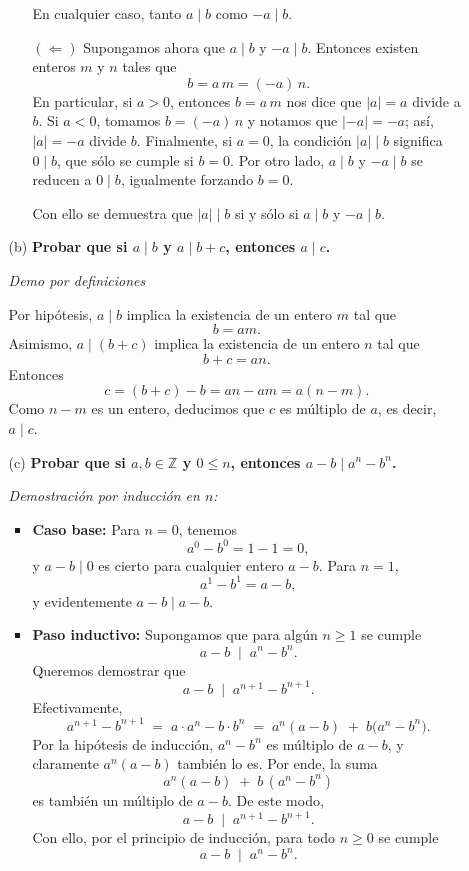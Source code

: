 \documentclass[12pt]{article}
\begin{document}
\begin{enumerate}
\begin{enumerate}
\begin{itemize}
    En cualquier caso, tanto $a \mid b$ como $-a \mid b$.
    
    \item[$(\Leftarrow)$] Supongamos ahora que $a \mid b$ y $-a \mid b$. Entonces existen enteros $m$ y $n$ tales que
    \[
    b = a\,m = (-a)\,n.
    \]
    En particular, si $a > 0$, entonces $b = a\,m$ nos dice que $|a| = a$ divide a $b$.  
    Si $a < 0$, tomamos $b = (-a)\,n$ y notamos que $|-a| = -a$; as\'i, $|a| = -a$ divide $b$.  
    Finalmente, si $a=0$, la condici\'on $|a|\mid b$ significa $0 \mid b$, que s\'olo se cumple si $b=0$. Por otro lado, $a\mid b$ y $-a\mid b$ se reducen a $0\mid b$, igualmente forzando $b=0$.  
    
    Con ello se demuestra que $|a|\mid b$ si y s\'olo si $a \mid b$ y $-a \mid b$.
    \end{itemize}
    
    \item[(b)] \textbf{Probar que si $a \mid b$ y $a \mid b + c$, entonces $a \mid c$.}
    
    \noindent
    \textit{Demo por definiciones}
    
    Por hip\'otesis, $a \mid b$ implica la existencia de un entero $m$ tal que 
    \[
    b = am.
    \]
    Asimismo, $a \mid (b + c)$ implica la existencia de un entero $n$ tal que
    \[
    b + c = a n.
    \]
    Entonces
    \[
    c = (b + c) - b = a n - a m = a(n - m).
    \]
    Como $n - m$ es un entero, deducimos que $c$ es m\'ultiplo de $a$, es decir, $a \mid c$.
    
    \item[(c)] \textbf{Probar que si $a,b \in \mathbb{Z}$ y $0 \leq n$, entonces $a - b \mid a^n - b^n$.}
    
    \noindent
    \textit{Demostraci\'on por inducci\'on en $n$:}
    
    \begin{itemize}
    \item \textbf{Caso base:}  
    Para $n=0$, tenemos 
    \[
    a^0 - b^0 = 1 - 1 = 0,
    \]
    y $a-b \mid 0$ es cierto para cualquier entero $a-b$. Para $n=1$, 
    \[
    a^1 - b^1 = a - b,
    \]
    y evidentemente $a-b \mid a-b$.
    
    \item \textbf{Paso inductivo:}  
    Supongamos que para alg\'un $n \ge 1$ se cumple
    \[
    a - b \;\mid\; a^n - b^n.
    \]
    Queremos demostrar que
    \[
    a - b \;\mid\; a^{n+1} - b^{n+1}.
    \]
    Efectivamente,
    \[
    a^{n+1} - b^{n+1} \;=\; a \cdot a^n - b \cdot b^n
    \;=\; a^n(a - b) \;+\; b \bigl(a^n - b^n\bigr).
    \]
    Por la hip\'otesis de inducci\'on, $a^n - b^n$ es m\'ultiplo de $a-b$, y claramente $a^n(a-b)$ tambi\'en lo es. Por ende, la suma
    \[
    a^n(a - b) \;+\; b\,(a^n - b^n)
    \]
    es tambi\'en un m\'ultiplo de $a-b$. De este modo, 
    \[
    a - b \;\mid\; a^{n+1} - b^{n+1}.
    \]
    Con ello, por el principio de inducci\'on, para todo $n \ge 0$ se cumple 
    \[
    a - b \;\mid\; a^n - b^n.
    \]
    \end{itemize}
    

\end{enumerate}
\end{enumerate}
\end{document}
